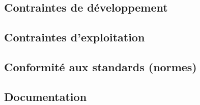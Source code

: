 
\subsection{Contraintes de développement}

\subsection{Contraintes d'exploitation}

\subsection{Conformité aux standards (normes)}

\subsection{Documentation}
